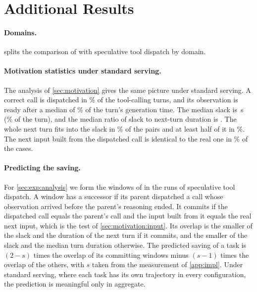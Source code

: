 \section{Additional Results}
\label{app:results}

\begin{table}[t]
\centering
\small
\setlength{\tabcolsep}{4pt}

\caption{Mean task time with speculative tool dispatch and with \method by domain, with the saving and its 95\% bootstrap interval.}
\label{tab:breakdown}
\end{table}

\paragraph{Domains.}
 splits the comparison of \method with speculative tool dispatch by domain.

\paragraph{Motivation statistics under standard serving.}
The analysis of \cref{sec:motivation} gives the same picture under standard serving.
A correct call is dispatched in \MotStdAnchorPct\% of the tool-calling turns, and its observation is ready after a median of \MotStdReadyPosPct\% of the turn's generation time.
The median slack is \MotStdSlackMedian\,s (\MotStdSlackSharePct\% of the turn), and the median ratio of slack to next-turn duration is \MotStdSlackOverNext.
The whole next turn fits into the slack in \MotStdNextFitsPct\% of the pairs and at least half of it in \MotStdNextHalfPct\%.
The next input built from the dispatched call is identical to the real one in \MotStdInputSamePct\% of the cases.

\paragraph{Predicting the saving.}
For \cref{sec:exp:analysis} we form the windows of \method in the runs of speculative tool dispatch.
A window has a successor if its parent dispatched a call whose observation arrived before the parent's reasoning ended.
It commits if the dispatched call equals the parent's call and the input built from it equals the real next input, which is the test of \cref{sec:motivation:input}.
Its overlap is the smaller of the slack and the duration of the next turn if it commits, and the smaller of the slack and the median turn duration otherwise.
The predicted saving of a task is $(2-s)$ times the overlap of its committing windows minus $(s-1)$ times the overlap of the others, with $s$ taken from the measurement of \cref{app:impl}.
Under standard serving, where each task has its own trajectory in every configuration, the prediction is meaningful only in aggregate.

